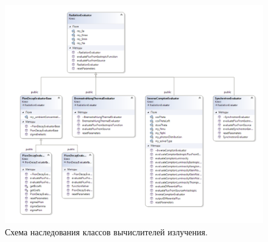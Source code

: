 \begin{figure}
	\centering
	\includegraphics[width=10.5 cm]{./fig/radiationEvaluator.png} 
	\caption{Схема наследования классов вычислителей излучения.}
	\label{radiationEvaluators}
\end{figure}

